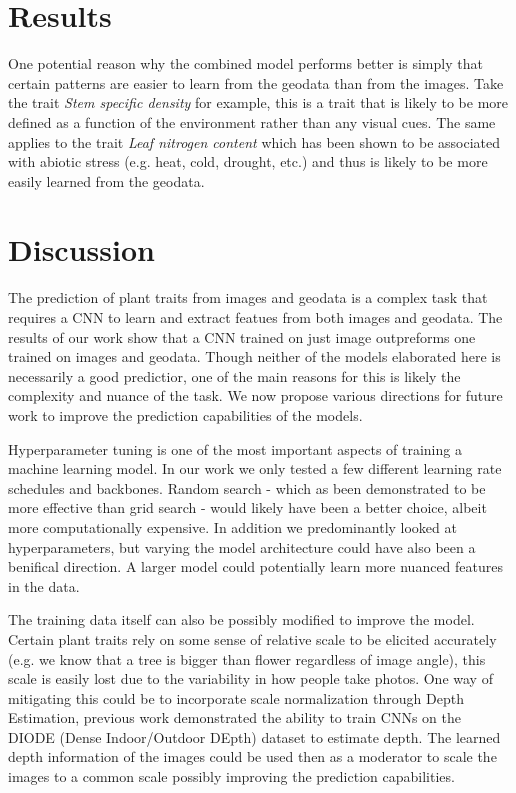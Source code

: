 \documentclass[12pt,a4paper,oneside]{article}
\begin{document}
\section{Results}

One potential reason why the combined model performs better is simply that certain patterns are easier to learn from the geodata than from the images. Take the trait \textit{Stem specific density} for example, this is a trait that is likely to be more defined as a function of the environment \cite{plants8030065} rather than any visual cues. The same applies to the trait \textit{Leaf nitrogen content} which has been shown to be associated with abiotic stress (e.g. heat, cold, drought, etc.) \cite{Ye2022} and thus is likely to be more easily learned from the geodata.


\section{Discussion}

The prediction of plant traits from images and geodata is a complex task that requires a CNN to learn and extract featues from both images and geodata. The results of our work show that a CNN trained on just image outpreforms one trained on images and geodata. Though neither of the models elaborated here is necessarily a good predictior, one of the main reasons for this is likely the complexity and nuance of the task. We now propose various directions for future work to improve the prediction capabilities of the models.

Hyperparameter tuning is one of the most important aspects of training a machine learning model. In our work we only tested a few different learning rate schedules and backbones. Random search - which as been demonstrated to be more effective than grid search \cite{JMLR:v13:bergstra12a} - would likely have been a better choice, albeit more computationally expensive. In addition we predominantly looked at hyperparameters, but varying the model architecture could have also been a benifical direction. A larger model could potentially learn more nuanced features in the data.

The training data itself can also be possibly modified to improve the model. Certain plant traits rely on some sense of relative scale to be elicited accurately (e.g. we know that a tree is bigger than flower regardless of image angle), this scale is easily lost due to the variability in how people take photos. One way of mitigating this could be to incorporate scale normalization through Depth Estimation, previous work \cite{Ummenhofer_2017} demonstrated the ability to train CNNs on the DIODE (Dense Indoor/Outdoor DEpth) \cite{vasiljevic2019diode} dataset to estimate depth. The learned depth information of the images could be used then as a moderator to scale the images to a common scale possibly improving the prediction capabilities.
\end{document}
